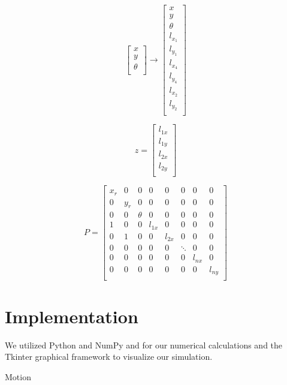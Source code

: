 \documentclass[prodmode,acmtecs]{acmsmall} %
\begin{document}
$$
\begin{bmatrix}
    x \\
    y \\
    \theta \\
\end{bmatrix}
\rightarrow
\begin{bmatrix}
    x \\
    y \\
    \theta \\
    l_{x_1} \\
    l_{y_1} \\
    l_{x_4} \\
    l_{y_4} \\
    l_{x_2} \\
    l_{y_2} \\
\end{bmatrix}
$$

$$
z = 
\begin{bmatrix}
    l_{1x} \\
    l_{1y} \\
    l_{2x} \\
    l_{2y} \\
\end{bmatrix}
$$

$$
P =
\begin{bmatrix}
    x_r & 0 & 0 & 0 & 0 & 0 & 0 & 0 \\
    0 & y_r & 0 & 0 & 0 & 0 & 0 & 0 \\
    0 & 0 & \theta & 0 & 0 & 0 & 0 & 0 \\
    1 & 0 & 0 & l_{1x} & 0 & 0 & 0 & 0 \\
    0 & 1 & 0 & 0 & l_{2x} & 0 & 0 & 0 \\
    0 & 0 & 0 & 0 & 0 & \ddots & 0 & 0 \\
    0 & 0 & 0 & 0 & 0 & 0 & l_{nx} & 0 \\
    0 & 0 & 0 & 0 & 0 & 0 & 0 & l_{ny} \\
\end{bmatrix}
$$






\section{Implementation}

We utilized Python and NumPy and for our numerical calculations and the Tkinter graphical framework to visualize our simulation.

Motion
\end{document}
